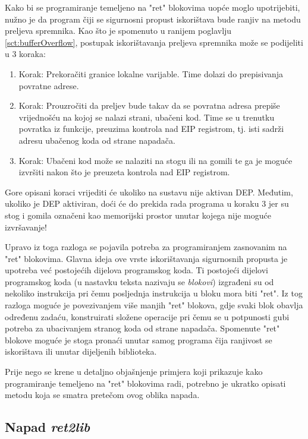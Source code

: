 \documentclass[times, utf8, diplomski, numeric]{fer}
\begin{document}
Kako bi se programiranje temeljeno na "ret" blokovima uopće moglo
upotrijebiti, nužno je da program čiji se sigurnosni propust
iskorištava bude ranjiv na metodu preljeva spremnika. Kao što je
spomenuto u ranijem poglavlju \ref{sct:bufferOverflow}, postupak
iskorištavanja preljeva spremnika može se podijeliti u 3 koraka:

\begin{enumerate}
\item Korak: Prekoračiti granice lokalne varijable. Time dolazi
do prepisivanja povratne adrese.
\item Korak: Prouzročiti da preljev bude takav da se povratna
adresa prepiše vrijednošću na kojoj se nalazi strani, ubačeni
kod. Time se u trenutku povratka iz funkcije, preuzima kontrola
nad EIP registrom, tj. isti sadrži adresu ubačenog koda od strane
napadača.
\item Korak: Ubačeni kod može se nalaziti na stogu ili na gomili
te ga je moguće izvršiti nakon što je preuzeta kontrola nad EIP
registrom.
\end{enumerate}

Gore opisani koraci vrijediti će ukoliko na sustavu nije aktivan
DEP. Međutim, ukoliko je DEP aktiviran, doći će do prekida rada
programa u koraku 3 jer su stog i gomila označeni kao memorijski
prostor unutar kojega nije moguće izvršavanje!

Upravo iz toga razloga se pojavila potreba za programiranjem
zasnovanim na "ret" blokovima. Glavna ideja ove vrste
iskorištavanja sigurnosnih propusta je upotreba već postojećih
dijelova programskog koda. Ti postojeći dijelovi programskog koda
(u nastavku teksta nazivaju se \emph{blokovi}) izgrađeni su od
nekoliko instrukcija pri čemu posljednja instrukcija u bloku mora
biti "ret". Iz tog razloga moguće je povezivanjem više manjih
"ret" blokova, gdje svaki blok obavlja određenu zadaću,
konstruirati složene operacije pri čemu se u potpunosti gubi
potreba za ubacivanjem stranog koda od strane napadača. Spomenute
"ret" blokove moguće je stoga pronaći unutar samog programa čija
ranjivost se iskorištava ili unutar dijeljenih biblioteka.

Prije nego se krene u detaljno objašnjenje primjera koji
prikazuje kako programiranje temeljeno na "ret" blokovima radi,
potrebno je ukratko opisati metodu koja se smatra pretečom ovog
oblika napada.

\subsection{Napad \emph{ret2lib}}
\end{document}
